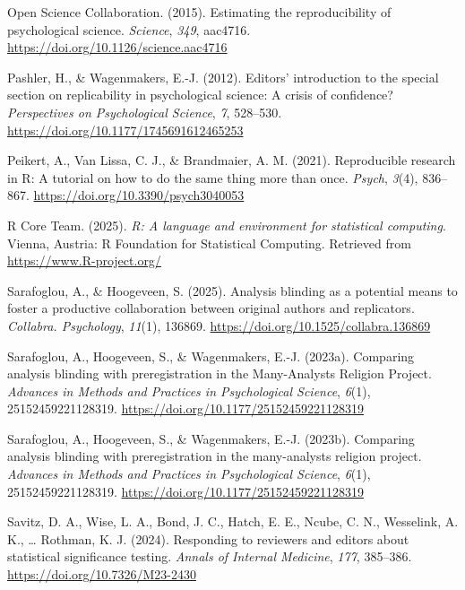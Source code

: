 \documentclass[
  english,
  man,floatsintext]{apa6}
\newlength{\cslhangindent}
\newenvironment{CSLReferences}[2] %
 {\begin{list}{}{%
  \setlength{\itemindent}{0pt}
  \setlength{\leftmargin}{0pt}
  \setlength{\parsep}{0pt}
  \ifodd #1
   \setlength{\leftmargin}{\cslhangindent}
   \setlength{\itemindent}{-1\cslhangindent}
  \fi
  \setlength{\itemsep}{#2\baselineskip}}}
 {\end{list}}
\begin{document}
\begin{CSLReferences}{1}{0}
Open Science Collaboration. (2015). Estimating the reproducibility of psychological science. \emph{Science}, \emph{349}, aac4716. \url{https://doi.org/10.1126/science.aac4716}

Pashler, H., \& Wagenmakers, E.-J. (2012). Editors' introduction to the special section on replicability in psychological science: {A} crisis of confidence? \emph{Perspectives on Psychological Science}, \emph{7}, 528--530. \url{https://doi.org/10.1177/1745691612465253}

Peikert, A., Van Lissa, C. J., \& Brandmaier, A. M. (2021). Reproducible research in {R}: {A} tutorial on how to do the same thing more than once. \emph{Psych}, \emph{3}(4), 836--867. \url{https://doi.org/10.3390/psych3040053}

R Core Team. (2025). \emph{R: A language and environment for statistical computing}. Vienna, Austria: R Foundation for Statistical Computing. Retrieved from \url{https://www.R-project.org/}

Sarafoglou, A., \& Hoogeveen, S. (2025). Analysis blinding as a potential means to foster a productive collaboration between original authors and replicators. \emph{Collabra. Psychology}, \emph{11}(1), 136869. \url{https://doi.org/10.1525/collabra.136869}

Sarafoglou, A., Hoogeveen, S., \& Wagenmakers, E.-J. (2023a). Comparing analysis blinding with preregistration in the {Many-Analysts Religion Project}. \emph{Advances in Methods and Practices in Psychological Science}, \emph{6}(1), 25152459221128319. \url{https://doi.org/10.1177/25152459221128319}

Sarafoglou, A., Hoogeveen, S., \& Wagenmakers, E.-J. (2023b). Comparing analysis blinding with preregistration in the many-analysts religion project. \emph{Advances in Methods and Practices in Psychological Science}, \emph{6}(1), 25152459221128319. \url{https://doi.org/10.1177/25152459221128319}

Savitz, D. A., Wise, L. A., Bond, J. C., Hatch, E. E., Ncube, C. N., Wesselink, A. K., \ldots{} Rothman, K. J. (2024). Responding to reviewers and editors about statistical significance testing. \emph{Annals of Internal Medicine}, \emph{177}, 385--386. \url{https://doi.org/10.7326/M23-2430}


\end{CSLReferences}
\end{document}
